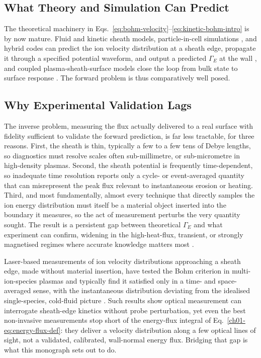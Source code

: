 \subsection{What Theory and Simulation Can Predict}

The theoretical machinery in Eqs.~\eqref{eq:bohm-velocity}--\eqref{eq:kinetic-bohm-intro} is by now mature. Fluid and kinetic sheath models, particle-in-cell simulations \cite{ref0633}, and hybrid codes can predict the ion velocity distribution at a sheath edge, propagate it through a specified potential waveform, and output a predicted $\Gamma_E$ at the wall \cite{ref0001,ref0017,ref0023}, and coupled plasma-sheath-surface models close the loop from bulk state to surface response \cite{ref0101}. The forward problem is thus comparatively well posed.

\subsection{Why Experimental Validation Lags}

The inverse problem, measuring the flux actually delivered to a real surface with fidelity sufficient to validate the forward prediction, is far less tractable, for three reasons. First, the sheath is thin, typically a few to a few tens of Debye lengths, so diagnostics must resolve scales often sub-millimetre, or sub-micrometre in high-density plasmas. Second, the sheath potential is frequently time-dependent, so inadequate time resolution reports only a cycle- or event-averaged quantity that can misrepresent the peak flux relevant to instantaneous erosion or heating. Third, and most fundamentally, almost every technique that directly samples the ion energy distribution must itself be a material object inserted into the boundary it measures, so the act of measurement perturbs the very quantity sought. The result is a persistent gap between theoretical $\Gamma_E$ and what experiment can confirm, widening in the high-heat-flux, transient, or strongly magnetised regimes where accurate knowledge matters most \cite{ref0093}.

Laser-based measurements of ion velocity distributions approaching a sheath edge, made without material insertion, have tested the Bohm criterion in multi-ion-species plasmas and typically find it satisfied only in a time- and space-averaged sense, with the instantaneous distribution deviating from the idealised single-species, cold-fluid picture \cite{ref0329}. Such results show optical measurement can interrogate sheath-edge kinetics without probe perturbation, yet even the best non-invasive measurements stop short of the energy-flux integral of Eq.~\eqref{ch01-eq:energy-flux-def}: they deliver a velocity distribution along a few optical lines of sight, not a validated, calibrated, wall-normal energy flux. Bridging that gap is what this monograph sets out to do.

